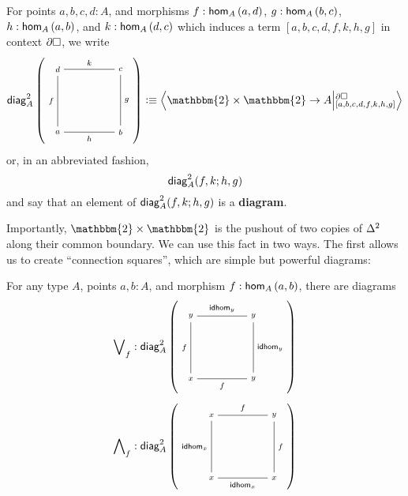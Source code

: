 \documentclass[main.tex]{subfiles}
\begin{document}
\begin{definition}
    For points $a,b,c,d : A$, and morphisms $f : \ho[A]{a}{d}$, $g : \ho[A]{b}{c}$, $h : \ho[A]{a}{b}$, and $k : \ho[A]{d}{c}$ which induces a term \linebreak $[a,b,c,d,f,k,h,g]$ in context $\pards$, we write
    $$\diag{A}(a,b,c,d,f,k,h,g) \defeq \ndexten{\mathbbm{2}\times\mathbbm{2}}{A}{\pards}{[a,b,c,d,f,k,h,g]}$$
    or, in an abbreviated fashion,
    $$\diagshort{A}(a,b,c,d,f,k,h,g)$$
    and say that an element of $\diagshort{A}(a,b,c,d,f,k,h,g)$ is a \textbf{diagram}.
\end{definition}
Importantly, $\mathbbm{2} \times \mathbbm{2}$ is the pushout of two copies of $\tsx$ along their common boundary. We can use this fact in two ways. The first allows us to create ``connection squares'', which are simple but powerful diagrams:
\begin{lemma}
    For any type $A$, points $a,b:A$, and morphism $f : \ho[A]{a}{b}$, there are diagrams
    $$\bigvee\nolimits_f : \diag{A}(x,y,y,y,f,\idhom{y},f,\idhom{y})$$
    $$\bigwedge\nolimits_f : \diag{A}(x,x,y,x,\idhom{x},f,\idhom{x},f)$$
\end{lemma}
\end{document}

